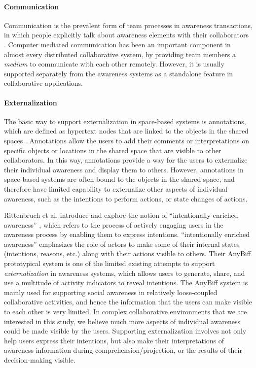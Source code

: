 \paragraph*{Communication} %
\label{par:communication}
Communication is the prevalent form of team processes in awareness transactions, in which people explicitly talk about awareness elements with their collaborators \cite{Gutwin2002}. Computer mediated communication has been an important component in almost every distributed collaborative system, by providing team members a \emph{medium} to communicate with each other remotely. However, it is usually supported separately from the awareness systems as a standalone feature in collaborative applications.

\paragraph*{Externalization} %
\label{par:externalization}
The basic way to support externalization in space-based systems is annotations, which are defined as hypertext nodes that are linked to the objects in the shared spaces \cite{Zheng2006,Weng2004}. Annotations allow the users to add their comments or interpretations on specific objects or locations in the shared space that are visible to other collaborators. In this way, annotations provide a way for the users to externalize their individual awareness and display them to others. However, annotations in space-based systems are often bound to the objects in the shared space, and therefore have limited capability to externalize other aspects of individual awareness, such as the intentions to perform actions, or state changes of actions. 

Rittenbruch et al. introduce and explore the notion of ``intentionally enriched awareness'' \cite{Rittenbruch2007}, which refers to the process of actively engaging users in the awareness process by enabling them to express intentions. ``intentionally enriched awareness'' emphasizes the role of actors to make some of their internal states (intentions, reasons, etc.) along with their actions visible to others. Their AnyBiff prototypical system is one of the limited existing attempts to support \emph{externalization} in awareness systems, which allows users to generate, share, and use a multitude of activity indicators to reveal intentions. The AnyBiff system is mainly used for supporting social awareness in relatively loose-coupled collaborative activities, and hence the information that the users can make visible to each other is very limited. In complex collaborative environments that we are interested in this study, we believe much more aspects of individual awareness could be made visible by the users. Supporting externalization involves not only help users express their intentions, but also make their interpretations of awareness information during comprehension/projection, or the results of their decision-making visible.

